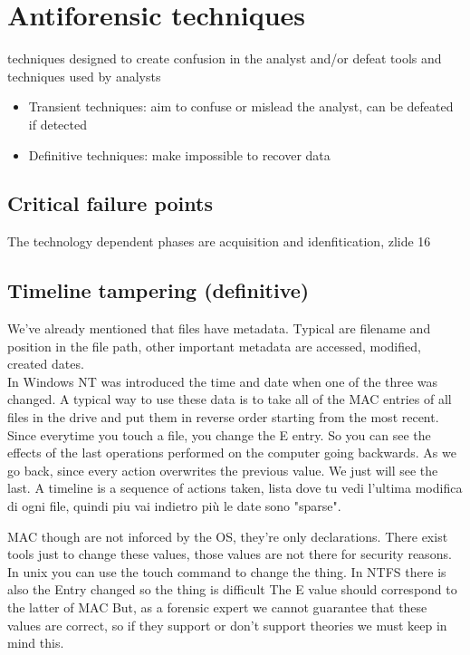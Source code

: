 \section{Antiforensic techniques}
    techniques designed to create confusion in the analyst and/or defeat tools and techniques used by analysts
    \begin{itemize}
        \item Transient techniques: aim to confuse or mislead the analyst, can be defeated if detected
        \item Definitive techniques: make impossible to recover data
    \end{itemize}
    \subsection{Critical failure points}
        The technology dependent phases are acquisition and idenfitication, 
        zlide 16
    \subsection{Timeline tampering (definitive)}
        We've already mentioned that files have metadata. Typical are filename and position in the file path, other important metadata are accessed, modified, created dates.\\
        In Windows NT was introduced the time and date when one of the three was changed.
        A typical way to use these data is to take all of the MAC entries of all files in the drive and put them in reverse order starting from the most recent.
        Since everytime you touch a file, you change the E entry. So you can see the effects of the last operations performed on the computer going backwards.
        As we go back, since every action overwrites the previous value. We just will see the last. A timeline is a sequence of actions taken,
        lista dove tu vedi l'ultima modifica di ogni file, quindi piu vai indietro più le date sono "sparse".

        MAC though are not inforced by the OS, they're only declarations. There exist tools just to change these values, those values are not there for security reasons.
        In unix you can use the touch command to change the thing.
        In NTFS there is also the Entry changed so the thing is difficult
        The E value should correspond to the latter of MAC 
        But, as a forensic expert we cannot guarantee that these values are correct, so if they support or don't support theories we must keep in mind this.

